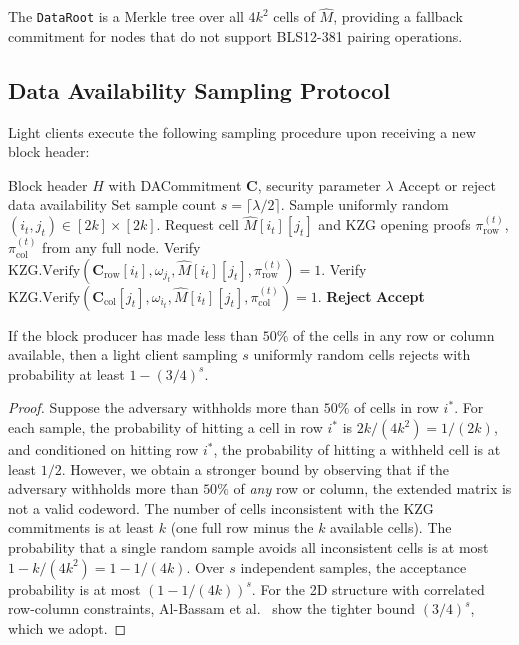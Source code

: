 The \texttt{DataRoot} is a Merkle tree over all $4k^2$ cells of $\hat{M}$, providing a
fallback commitment for nodes that do not support BLS12-381 pairing operations.

\subsection{Data Availability Sampling Protocol}
\label{sec:protocol:sampling}

Light clients execute the following sampling procedure upon receiving a new block header:

\begin{algorithm}[H]
\caption{Light Client DAS}
\label{alg:das-sampling}
\begin{algorithmic}[1]
\Require Block header $H$ with DACommitment $\mathbf{C}$, security parameter $\lambda$
\Ensure Accept or reject data availability
\State Set sample count $s = \lceil \lambda / 2 \rceil$.
    \State Sample uniformly random $(i_t, j_t) \in [2k] \times [2k]$.
    \State Request cell $\hat{M}[i_t][j_t]$ and KZG opening proofs $\pi_{\text{row}}^{(t)}$,
           $\pi_{\text{col}}^{(t)}$ from any full node.
    \State Verify $\text{KZG.Verify}(\mathbf{C}_{\text{row}}[i_t], \omega_{j_t}, \hat{M}[i_t][j_t],
           \pi_{\text{row}}^{(t)}) = 1$.
    \State Verify $\text{KZG.Verify}(\mathbf{C}_{\text{col}}[j_t], \omega_{i_t}, \hat{M}[i_t][j_t],
           \pi_{\text{col}}^{(t)}) = 1$.
        \State \Return \textbf{Reject}
    \EndIf
\EndFor
\State \Return \textbf{Accept}
\end{algorithmic}
\end{algorithm}

\begin{theorem}
\label{thm:sampling-security}
If the block producer has made less than $50\%$ of the cells in any row or column available,
then a light client sampling $s$ uniformly random cells rejects with probability at least
$1 - (3/4)^s$.
\end{theorem}

\begin{proof}
Suppose the adversary withholds more than $50\%$ of cells in row $i^*$. For each sample,
the probability of hitting a cell in row $i^*$ is $2k / (4k^2) = 1/(2k)$, and conditioned
on hitting row $i^*$, the probability of hitting a withheld cell is at least $1/2$. However,
we obtain a stronger bound by observing that if the adversary withholds more than $50\%$ of
\emph{any} row or column, the extended matrix is not a valid codeword. The number of cells
inconsistent with the KZG commitments is at least $k$ (one full row minus the $k$ available
cells). The probability that a single random sample avoids all inconsistent cells is at most
$1 - k/(4k^2) = 1 - 1/(4k)$. Over $s$ independent samples, the acceptance probability is
at most $(1 - 1/(4k))^s$. For the 2D structure with correlated row-column constraints, Al-Bassam
et al.~\cite{albassam2018fraud} show the tighter bound $(3/4)^s$, which we adopt.
\end{proof}

